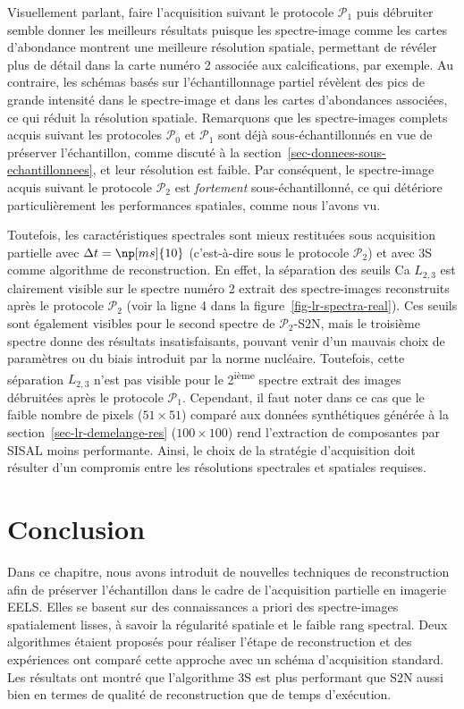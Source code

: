 Visuellement parlant, faire l'acquisition suivant le protocole $\mathcal{P}_1$ puis débruiter semble donner les meilleurs résultats puisque les spectre-image comme les cartes d'abondance montrent une meilleure résolution spatiale, permettant de révéler plus de détail dans la carte numéro 2 associée aux calcifications, par exemple. 
%
Au contraire, les schémas basés sur l'échantillonnage partiel révèlent des pics de grande intensité dans le spectre-image et dans les cartes d'abondances associées, ce qui réduit la résolution spatiale.
%
Remarquons que les spectre-images complets acquis suivant les protocoles $\mathcal{P}_0$ et $\mathcal{P}_1$ sont déjà sous-échantillonnés en vue de préserver l'échantillon, comme discuté à la section~\ref{sec-donnees-sous-echantillonnees}, et leur résolution est faible. Par conséquent, le spectre-image acquis suivant le protocole $\mathcal{P}_2$ est \emph{fortement} sous-échantillonné, ce qui détériore particulièrement les performances spatiales, comme nous l'avons vu.

Toutefois, les caractéristiques spectrales sont mieux restituées sous acquisition partielle avec $\Delta t=\np[ms]{10}$ (c'est-à-dire sous le protocole $\mathcal{P}_2$) et avec 3S comme algorithme de reconstruction. En effet, la séparation des seuils Ca $L_{2, 3}$ est clairement visible sur le spectre numéro 2 extrait des spectre-images reconstruits après le protocole $\mathcal{P}_2$ (voir la ligne 4 dans la figure~\ref{fig-lr-spectra-real}). Ces seuils sont également visibles pour le second spectre de $\mathcal{P}_2$-S2N, mais le troisième spectre donne des résultats insatisfaisants, pouvant venir d'un mauvais choix de paramètres ou du biais introduit par la norme nucléaire. Toutefois, cette séparation $L_{2, 3}$ n'est pas visible pour le 2\textsuperscript{ième} spectre extrait des images débruitées après le protocole $\mathcal{P}_1$. Cependant, il faut noter dans ce cas que le faible nombre de pixels ($51\times 51$) comparé aux données synthétiques générée à la section~\ref{sec-lr-demelange-res} ($100\times 100$) rend l'extraction de composantes par SISAL moins performante. 
%
Ainsi, le choix de la stratégie d'acquisition doit résulter d'un compromis entre les résolutions spectrales et spatiales requises. 
%
 


%
\section{Conclusion}

Dans ce chapitre, nous avons introduit de nouvelles techniques de reconstruction afin de préserver l'échantillon dans le cadre de l'acquisition partielle en imagerie EELS. Elles se basent sur des connaissances a priori des spectre-images spatialement lisses, à savoir la régularité spatiale et le faible rang spectral. 
%
Deux algorithmes étaient proposés pour réaliser l'étape de reconstruction et des expériences ont comparé cette approche avec un schéma d'acquisition standard. Les résultats ont montré que l'algorithme 3S est plus performant que S2N aussi bien en termes de qualité de reconstruction que de temps d'exécution.

